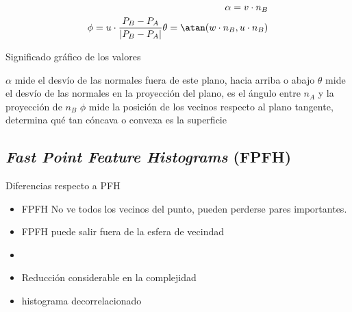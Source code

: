 \begin{eqnarray}
	\alpha = v \cdot n_B \\
	\phi = u \cdot \frac{P_B - P_A}{|P_B - P_A|}
	\theta = \atan(w \cdot n_B, u \cdot n_B)
\end{eqnarray}

Significado gráfico de los valores


$\alpha$ mide el desvío de las normales fuera de este plano, hacia arriba o abajo
$\theta$ mide el desvío de las normales en la proyección del plano, es el ángulo entre $n_A$ y la proyección de $n_B$
$\phi$ mide la posición de los vecinos respecto al plano tangente, determina qué tan cóncava o convexa es la superficie



\subsection{\emph{Fast Point Feature Histograms} (FPFH)}
Diferencias respecto a PFH
\begin{itemize}
	\item FPFH No ve todos los vecinos del punto, pueden perderse pares importantes.
	\item FPFH puede salir fuera de la esfera de vecindad
	\item {}
	\item Reducción considerable en la complejidad
	\item histograma decorrelacionado
\end{itemize}

